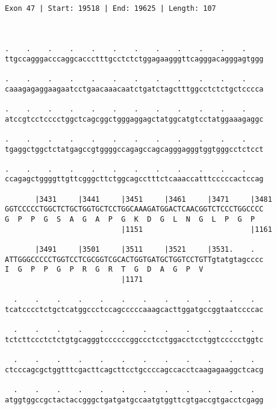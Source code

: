 \documentclass{article}
\begin{document}
\begin{Verbatim}
                                                      
 
Exon 47 | Start: 19518 | End: 19625 | Length: 107



.    .    .    .    .    .    .    .    .    .    .    .    
ttgccagggacccaggcaccctttgcctctctggagaagggttcagggacagggagtggg
                                                            
.    .    .    .    .    .    .    .    .    .    .    .    
caaagagaggaagaatcctgaacaaacaatctgatctagctttggcctctctgctcccca
                                                            
.    .    .    .    .    .    .    .    .    .    .    .    
atccgtcctcccctggctcagcggctgggaggagctatggcatgtcctatggaaagaggc
                                                            
.    .    .    .    .    .    .    .    .    .    .    .    
tgaggctggctctatgagccgtggggccagagccagcagggagggtggtgggcctctcct
                                                            
.    .    .    .    .    .    .    .    .    .    .    .    
ccagagctggggttgttcgggcttctggcagcctttctcaaaccatttcccccactccag
                                                            
       |3431     |3441     |3451     |3461     |3471     |3481
GGTCCCCCTGGCTCTGCTGGTGCTCCTGGCAAAGATGGACTCAACGGTCTCCCTGGCCCC
G  P  P  G  S  A  G  A  P  G  K  D  G  L  N  G  L  P  G  P  
                           |1151                         |1161
  
       |3491     |3501     |3511     |3521     |3531.    .  
ATTGGGCCCCCTGGTCCTCGCGGTCGCACTGGTGATGCTGGTCCTGTTgtatgtagcccc
I  G  P  P  G  P  R  G  R  T  G  D  A  G  P  V              
                           |1171                            
  
  .    .    .    .    .    .    .    .    .    .    .    .  
tcatcccctctgctcatggccctccagcccccaaagcacttggatgccggtaatccccac
                                                            
  .    .    .    .    .    .    .    .    .    .    .    .  
tctcttccctctctgtgcagggtccccccggccctcctggacctcctggtccccctggtc
                                                            
  .    .    .    .    .    .    .    .    .    .    .    .  
ctcccagcgctggtttcgacttcagcttcctgccccagccacctcaagagaaggctcacg
                                                            
  .    .    .    .    .    .    .    .    .    .    .    .  
atggtggccgctactaccgggctgatgatgccaatgtggttcgtgaccgtgacctcgagg
                                                            

\end{Verbatim}
\end{document}
